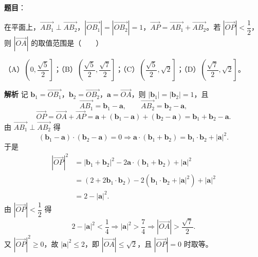 \begin{answer}

\textbf{题目}：

在平面上，$\overrightarrow{AB_1}\perp\overrightarrow{AB_2}$，$|\overrightarrow{OB_1}|=|\overrightarrow{OB_2}|=1$，$\overrightarrow{AP}=\overrightarrow{AB_1}+\overrightarrow{AB_2}$。若 $|\overrightarrow{OP}|<\dfrac12$，则 $|\overrightarrow{OA}|$ 的取值范围是\mbox{（　　）}

（A）$\left(0,\dfrac{\sqrt5}2\right]$；（B）$\left(\dfrac{\sqrt5}2,\dfrac{\sqrt7}2\right]$；（C）$\left(\dfrac{\sqrt5}2,\sqrt2\right]$；（D）$\left(\dfrac{\sqrt7}2,\sqrt2\right]$。

\textbf{解析}
记 $\boldsymbol b_1=\overrightarrow{OB_1}$，$\boldsymbol b_2=\overrightarrow{OB_2}$，$\boldsymbol a=\overrightarrow{OA}$，则 $|\boldsymbol b_1|=|\boldsymbol b_2|=1$，且
\nopagebreak[4]
\[\overrightarrow{AB_1}=\boldsymbol b_1-\boldsymbol a,\qquad
\overrightarrow{AB_2}=\boldsymbol b_2-\boldsymbol a,\]
\nopagebreak[4]
\[\overrightarrow{OP}=\overrightarrow{OA}+\overrightarrow{AP}
=\boldsymbol a+(\boldsymbol b_1-\boldsymbol a)+(\boldsymbol b_2-\boldsymbol a)
=\boldsymbol b_1+\boldsymbol b_2-\boldsymbol a.\]
由 $\overrightarrow{AB_1}\perp\overrightarrow{AB_2}$ 得
\nopagebreak[4]
\[(\boldsymbol b_1-\boldsymbol a)\cdot(\boldsymbol b_2-\boldsymbol a)=0
\Longrightarrow \boldsymbol a\cdot(\boldsymbol b_1+\boldsymbol b_2)=\boldsymbol b_1\cdot\boldsymbol b_2+|\boldsymbol a|^2.\]
于是
\nopagebreak[4]
\[\begin{aligned}
|\overrightarrow{OP}|^2
&=|\boldsymbol b_1+\boldsymbol b_2|^2-2\boldsymbol a\cdot(\boldsymbol b_1+\boldsymbol b_2)+|\boldsymbol a|^2\\
&=(2+2\boldsymbol b_1\cdot\boldsymbol b_2)-2(\boldsymbol b_1\cdot\boldsymbol b_2+|\boldsymbol a|^2)+|\boldsymbol a|^2\\
&=2-|\boldsymbol a|^2.
\end{aligned}\]
由 $|\overrightarrow{OP}|<\dfrac12$ 得
\nopagebreak[4]
\[2-|\boldsymbol a|^2<\frac14\Longrightarrow|\boldsymbol a|^2>\frac74\Longrightarrow|\overrightarrow{OA}|>\frac{\sqrt7}2.\]
又 $|\overrightarrow{OP}|^2\geqslant0$，故 $|\boldsymbol a|^2\leqslant2$，即 $|\overrightarrow{OA}|\leqslant\sqrt2$，且 $|\overrightarrow{OP}|=0$ 时取等。


\end{answer}
